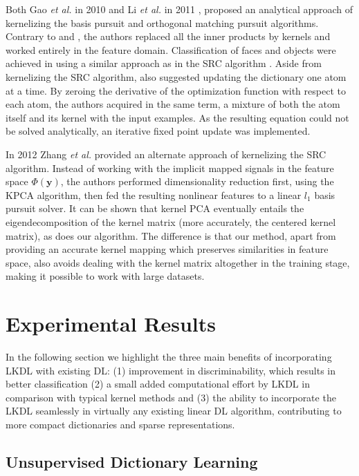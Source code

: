 \documentclass[journal]{IEEEtran}
\newcommand{\by}{\mathbf{y}}
\begin{document}
Both Gao \textit{et al.} in 2010 \cite{KSR} and Li \textit{et al.} in 2011 \cite{KernelOMP}, proposed an analytical approach of kernelizing the basis pursuit and orthogonal matching pursuit algorithms. Contrary to \cite{KMP} and \cite{KBP}, the authors replaced all the inner products by kernels and worked entirely in the feature domain. Classification of faces and objects were achieved in \cite{KSR} using a similar approach as in the SRC algorithm \cite{Classification}.
Aside from kernelizing the SRC algorithm, \cite{KSR} also suggested updating the dictionary one atom at a time. By zeroing the derivative of the optimization function with respect to each atom, the authors acquired in the same term, a mixture of both the atom itself and its kernel with the input examples. As the resulting equation could not be solved analytically, an iterative fixed point update was implemented.

In 2012 Zhang \textit{et al.} \cite{KernelSRC1} provided an alternate approach of kernelizing the SRC algorithm. Instead of working with the implicit mapped signals in the feature space $\Phi(\by)$, the authors performed dimensionality reduction first, using the KPCA algorithm, then fed the resulting nonlinear features to a linear $l_1$ basis pursuit solver.
It can be shown that kernel PCA eventually entails the eigendecomposition of the kernel matrix (more accurately, the centered kernel matrix), as does our algorithm. The difference is that our method, apart from providing an accurate kernel mapping which preserves similarities in feature space, also avoids dealing with the kernel matrix altogether in the training stage, making it possible to work with large datasets.

\section{Experimental Results} \label{Results}

In the following section we highlight the three main benefits of incorporating LKDL with existing DL: (1) improvement in discriminability, which results in better classification (2) a small added computational effort by LKDL in comparison with typical kernel methods and (3) the ability to incorporate the LKDL seamlessly in virtually any existing linear DL algorithm, contributing to more compact dictionaries and sparse representations.

\subsection{Unsupervised Dictionary Learning} \label{SS:Unsupervised}
\end{document}
